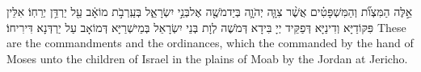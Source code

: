 {אֵ֣לֶּה הַמִּצְוֺ֞ת וְהַמִּשְׁפָּטִ֗ים אֲשֶׁ֨ר צִוָּ֧ה יְהֹוָ֛ה בְּיַד\maqqaf מֹשֶׁ֖ה אֶל\maqqaf בְּנֵ֣י יִשְׂרָאֵ֑ל בְּעַֽרְבֹ֣ת מוֹאָ֔ב עַ֖ל יַרְדֵּ֥ן יְרֵחֽוֹ׃}
{אִלֵּין פִּקּוֹדַיָּא וְדִינַיָּא דְּפַקֵּיד יְיָ בִּידָא דְּמֹשֶׁה לְוָת בְּנֵי יִשְׂרָאֵל בְּמֵישְׁרַיָּא דְּמוֹאָב עַל יַרְדְּנָא דִּירִיחוֹ׃}
{These are the commandments and the ordinances, which the \lord\space commanded by the hand of Moses unto the children of Israel in the plains of Moab by the Jordan at Jericho.}{}

\newperek
